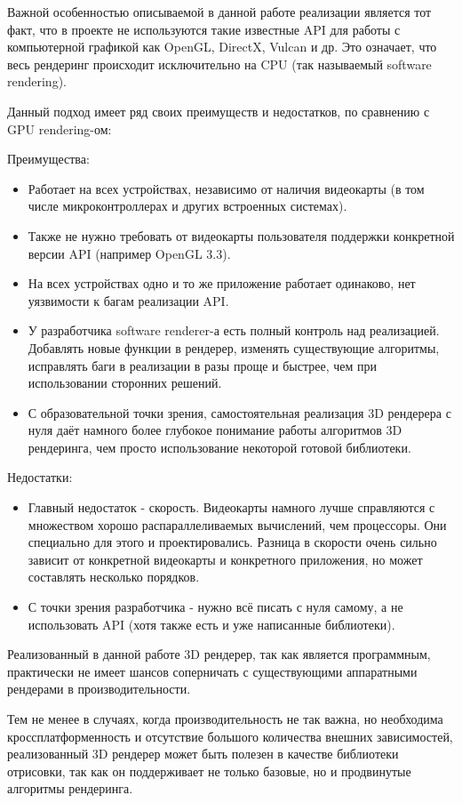 \documentclass[14pt]{extarticle}
\begin{document}
Важной особенностью описываемой в данной работе реализации является тот факт, что в проекте не используются такие известные API для работы с компьютерной графикой как OpenGL, DirectX, Vulcan и др. Это означает, что весь рендеринг происходит исключительно на CPU (так называемый software rendering). 

Данный подход имеет ряд своих преимуществ и недостатков, по сравнению с GPU rendering-ом:

Преимущества:
\begin{itemize}
	\item Работает на всех устройствах, независимо от наличия видеокарты (в том числе микроконтроллерах и других встроенных системах).
	\item Также не нужно требовать от видеокарты пользователя поддержки конкретной версии API (например OpenGL 3.3).
	\item На всех устройствах одно и то же приложение работает одинаково, нет уязвимости к багам реализации API.
	\item У разработчика software renderer-а есть полный контроль над реализацией. Добавлять новые функции в рендерер, изменять существующие алгоритмы, исправлять баги в реализации в разы проще и быстрее, чем при использовании сторонних решений.
	\item С образовательной точки зрения, самостоятельная реализация 3D рендерера с нуля даёт намного более глубокое понимание работы алгоритмов 3D рендеринга, чем просто использование некоторой готовой библиотеки.
\end{itemize}

Недостатки:
\begin{itemize}
	\item Главный недостаток - скорость. Видеокарты намного лучше справляются с множеством хорошо распараллеливаемых вычислений, чем процессоры. Они специально для этого и проектировались. Разница в скорости очень сильно зависит от конкретной видеокарты и конкретного приложения, но может составлять несколько порядков.
	\item С точки зрения разработчика - нужно всё писать с нуля самому, а не использовать API (хотя также есть и уже написанные библиотеки).
\end{itemize}

Реализованный в данной работе 3D рендерер, так как является программным, практически не имеет шансов соперничать с существующими аппаратными рендерами в производительности.

Тем не менее в случаях, когда производительность не так важна, но необходима кроссплатформенность и отсутствие большого количества внешних зависимостей, реализованный 3D рендерер может быть полезен в качестве библиотеки отрисовки, так как он поддерживает не только базовые, но и продвинутые алгоритмы рендеринга.
\end{document}
